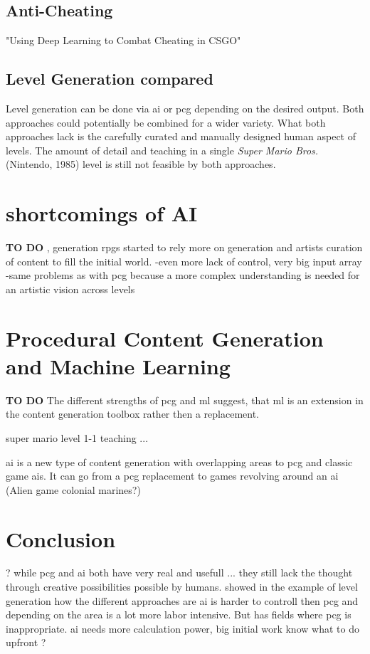 \documentclass[10pt,a4paper]{article}
\begin{document}
\subsection{Anti-Cheating}
"Using Deep Learning to Combat Cheating in CSGO"

\subsection{Level Generation compared}
Level generation can be done via \gls{ai} or \gls{pcg} depending on the desired output. Both approaches could potentially be combined for a wider variety. What both approaches lack is the carefully curated and manually designed human aspect of levels. The amount of detail and teaching in a single \textit{Super Mario Bros.} (Nintendo, 1985) level\cite{EurogamerMiyamotoInterview} is still not feasible by both approaches.

\section{shortcomings of AI}
\textbf{TO DO}
, generation \gls{rpg}s started to rely more on generation and artists curation of content to fill the initial world.
-even more lack of control, very big input array
-same problems as with \gls{pcg} because a more complex understanding is needed for an artistic vision across levels

\section{Procedural Content Generation and Machine Learning}
\textbf{TO DO}
The different strengths of \gls{pcg} and \gls{ml} suggest, that \gls{ml} is an extension in the content generation toolbox rather then a replacement.

super mario level 1-1 teaching ...

\gls{ai} is a new type of content generation with overlapping areas to \gls{pcg} and classic game \gls{ai}s. It can go from a \gls{pcg} replacement to games revolving around an \gls{ai} (Alien game colonial marines?)

\section{Conclusion}

?
while pcg and ai both have very real and usefull ... they still lack the thought through creative possibilities possible by humans.
showed in the example of level generation how the different approaches are
ai is harder to controll then \gls{pcg} and depending on the area is a lot more labor intensive. But has fields where \gls{pcg} is inappropriate.
ai needs more calculation power, big initial work
know what to do upfront
?
\end{document}
